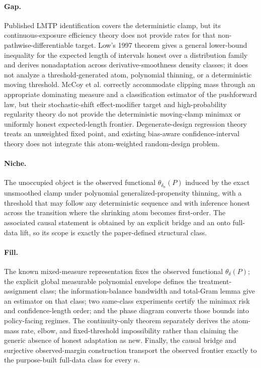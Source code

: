 \documentclass{article}
\begin{document}
\paragraph{Gap.} Published LMTP identification covers the deterministic clamp, but its continuous-exposure efficiency theory does not provide rates for that non-pathwise-differentiable target. Low's 1997 theorem gives a general lower-bound inequality for the expected length of intervals honest over a distribution family and derives nonadaptation across derivative-smoothness density classes; it does not analyze a threshold-generated atom, polynomial thinning, or a deterministic moving threshold. McCoy et al. correctly accommodate clipping mass through an appropriate dominating measure and a classification estimator of the pushforward law, but their stochastic-shift effect-modifier target and high-probability regularity theory do not provide the deterministic moving-clamp minimax or uniformly honest expected-length frontier. Degenerate-design regression theory treats an unweighted fixed point, and existing bias-aware confidence-interval theory does not integrate this atom-weighted random-design problem.

\paragraph{Niche.} The unoccupied object is the observed functional \(\theta_{\delta_n}(P)\) induced by the exact unsmoothed clamp under polynomial generalized-propensity thinning, with a threshold that may follow any deterministic sequence and with inference honest across the transition where the shrinking atom becomes first-order. The associated causal statement is obtained by an explicit bridge and an onto full-data lift, so its scope is exactly the paper-defined structural class.

\paragraph{Fill.} The known mixed-measure representation fixes the observed functional \(\theta_\delta(P)\); the explicit global measurable polynomial envelope defines the treatment-assignment class; the information-balance bandwidth and total-Gram lemma give an estimator on that class; two same-class experiments certify the minimax risk and confidence-length order; and the phase diagram converts those bounds into policy-facing regimes. The continuity-only theorem separately derives the atom-mass rate, elbow, and fixed-threshold impossibility rather than claiming the generic absence of honest adaptation as new. Finally, the causal bridge and surjective observed-margin construction transport the observed frontier exactly to the purpose-built full-data class for every \(n\).
\end{document}
